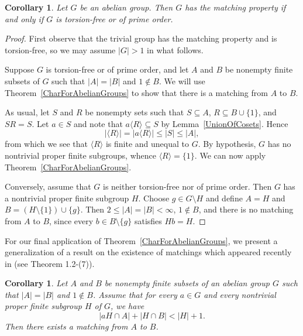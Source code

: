\documentclass[11pt]{amsart}
\newtheorem{corollary}[theorem]{Corollary}
\theoremstyle{definition}
\theoremstyle{remark}
\begin{document}
\begin{corollary}  \label{MatchingPropertyGroup}
Let \( G \) be an abelian group.  Then \( G \) has the matching property if and only if \( G \) is torsion-free or of prime order.  
\end{corollary}

\begin{proof}
First observe that the trivial group has the matching property and is torsion-free, so we may assume \( |G| > 1 \) in what follows.

Suppose \( G \) is torsion-free or of prime order, and let \( A \) and \( B \) be nonempty finite subsets of \( G \) such that \( |A| = |B| \) and \( 1 \notin B \).  We will use Theorem~\ref{CharForAbelianGroups} to show that there is a matching from \( A \) to \( B \).

As usual, let \( S \) and \( R \) be nonempty sets such that  \( S \subseteq A \), \( R \subseteq B \cup \{ 1 \} \), and \( SR = S \). Let \( a \in S \) and note that \( a \langle R \rangle \subseteq S \) by Lemma~\ref{UnionOfCosets}. Hence 
\[ | \langle R \rangle | = |a \langle R \rangle | \leq |S| \leq |A|, \] 
from which we see that \( \langle R \rangle \) is finite and unequal to \( G \).  By hypothesis, \( G \) has no nontrivial proper finite subgroups, whence \( \langle R \rangle = \{ 1 \} \). We can now apply Theorem~\ref{CharForAbelianGroups}.

Conversely, assume that \( G \) is neither torsion-free nor of prime order.  Then \( G \) has a nontrivial proper finite subgroup \( H \). Choose \( g \in G \setminus H \) and define \( A = H \) and \( B = (H \setminus \{ 1 \} ) \cup \{ g \} \).  Then \( 2 \leq  |A| = |B| < \infty \), \( 1 \notin B \), and there is no matching from \( A \) to \( B \), since every \( b \in B \setminus \{ g \} \) satisfies \( Hb = H \).
\end{proof}


For our final application of Theorem~\ref{CharForAbelianGroups}, we present a generalization of a result on the existence of matchings which appeared recently in  \cite{Aliabadi 2} (see Theorem 1.2-(7)).


\begin{corollary}\label{large sumsets}
Let \( A \) and \( B \) be nonempty finite subsets of an abelian group \( G \) such that \( |A| = |B| \) and \( 1 \notin B \). Assume that for every \( a \in G \) and every nontrivial proper finite subgroup \( H \) of \( G \), we have 
\[ |aH \cap A| + |H \cap B| < |H| + 1. \]
Then there exists a matching from \( A \) to \( B \).
\end{corollary}
\end{document}

